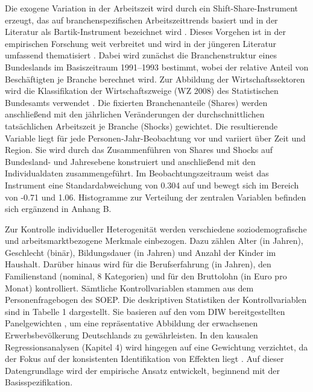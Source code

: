 \documentclass[12pt,a4paper]{article}
\begin{document}
Die exogene Variation in der Arbeitszeit wird durch ein Shift-Share-Instrument erzeugt, das auf branchenspezifischen Arbeitszeittrends basiert und in der Literatur als Bartik-Instrument bezeichnet wird \parencite{bartik1991}. Dieses Vorgehen ist in der empirischen Forschung weit verbreitet und wird in der jüngeren Literatur umfassend thematisiert \parencite{goldsmith2020,borusyak2025}. Dabei wird zunächst die Branchenstruktur eines Bundeslands im Basiszeitraum 1991–1993 bestimmt, wobei der relative Anteil von Beschäftigten je Branche berechnet wird. Zur Abbildung der Wirtschaftssektoren wird die Klassifikation der Wirtschaftszweige (WZ 2008) des Statistischen Bundesamts verwendet \parencite{branchenklassifikation}. Die fixierten Branchenanteile (Shares) werden anschließend mit den jährlichen Veränderungen der durchschnittlichen tatsächlichen Arbeitszeit je Branche (Shocks) gewichtet. Die resultierende Variable liegt für jede Personen-Jahr-Beobachtung vor und variiert über Zeit und Region. Sie wird durch das Zusammenführen von Shares und Shocks auf Bundesland- und Jahresebene konstruiert und anschließend mit den Individualdaten zusammengeführt. Im Beobachtungszeitraum weist das Instrument eine Standardabweichung von 0.304 auf und bewegt sich im Bereich von -0.71 und 1.06. Histogramme zur Verteilung der zentralen Variablen befinden sich ergänzend in Anhang B.

Zur Kontrolle individueller Heterogenität werden verschiedene soziodemografische und arbeitsmarktbezogene Merkmale einbezogen. Dazu zählen Alter (in Jahren), Geschlecht (binär), Bildungsdauer (in Jahren) und Anzahl der Kinder im Haushalt. Darüber hinaus wird für die Berufserfahrung (in Jahren), den Familienstand (nominal, 8 Kategorien) und für den Bruttolohn (in Euro pro Monat) kontrolliert. Sämtliche Kontrollvariablen stammen aus dem Personenfragebogen des SOEP. Die deskriptiven Statistiken der Kontrollvariablen sind in Tabelle 1 dargestellt. Sie basieren auf den vom DIW bereitgestellten Panelgewichten \parencite{soep_companion}, um eine repräsentative Abbildung der erwachsenen Erwerbsbevölkerung Deutschlands zu gewährleisten. In den kausalen Regressionsanalysen (Kapitel 4) wird hingegen auf eine Gewichtung verzichtet, da der Fokus auf der konsistenten Identifikation von Effekten liegt \parencite{solon2015}. Auf dieser Datengrundlage wird der empirische Ansatz entwickelt, beginnend mit der Basisspezifikation.


\end{document}
